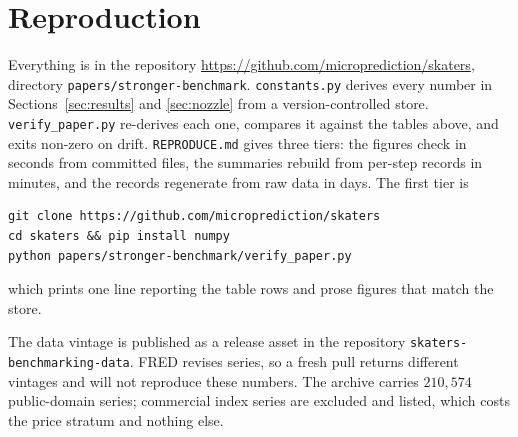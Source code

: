 \documentclass[article]{jss}
\providecommand{\proglang}[1]{\textsf{#1}}
\providecommand{\code}[1]{\texttt{#1}}
\begin{document}
\section{Reproduction}\label{sec:repro}

Everything is in the repository
\url{https://github.com/microprediction/skaters}, directory
\code{papers/stronger-benchmark}. \code{constants.py} derives every number in
Sections~\ref{sec:results} and \ref{sec:nozzle} from a version-controlled
store. \code{verify\_paper.py} re-derives each one, compares it against the
tables above, and exits non-zero on drift. \code{REPRODUCE.md} gives three
tiers: the figures check in seconds from committed files, the summaries rebuild
from per-step records in minutes, and the records regenerate from raw data in
days. The first tier is
\begin{verbatim}
git clone https://github.com/microprediction/skaters
cd skaters && pip install numpy
python papers/stronger-benchmark/verify_paper.py
\end{verbatim}
which prints one line reporting the table rows and prose figures that match
the store.

The data vintage is published as a release asset in the repository
\code{skaters-\allowbreak benchmarking-\allowbreak data}. \proglang{FRED} revises series, so a fresh
pull returns different vintages and will not reproduce these numbers. The archive carries $210{,}574$ public-domain series; commercial index
series are excluded and listed, which costs the price stratum and nothing else.



\end{document}
